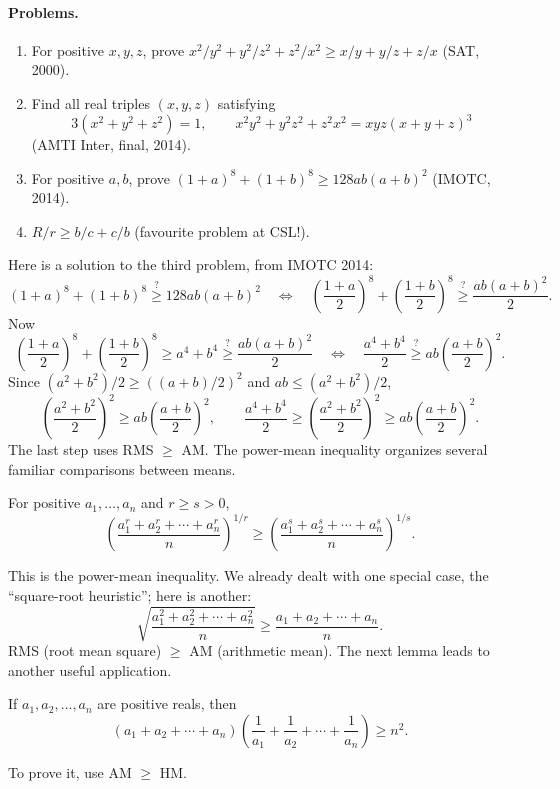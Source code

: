 \documentclass[11pt,a4paper]{article}
\begin{document}
\paragraph{Problems.}
\begin{enumerate}
\setcounter{enumi}{0}\item For positive $x,y,z$, prove $x^2/y^2+y^2/z^2+z^2/x^2\geq x/y+y/z+z/x$ (SAT, 2000).
\setcounter{enumi}{1}\item Find all real triples $(x,y,z)$ satisfying
\[3(x^2+y^2+z^2)=1,\qquad x^2y^2+y^2z^2+z^2x^2=xyz(x+y+z)^3\]
(AMTI Inter, final, 2014).
\setcounter{enumi}{2}\item For positive $a,b$, prove $(1+a)^8+(1+b)^8\geq128ab(a+b)^2$ (IMOTC, 2014).
\setcounter{enumi}{3}\item $R/r\geq b/c+c/b$ (favourite problem at CSL!).
\end{enumerate}
Here is a solution to the third problem, from IMOTC 2014:
\[
(1+a)^8+(1+b)^8\mathrel{\stackrel{?}{\geq}}128ab(a+b)^2
\quad\Longleftrightarrow\quad
\left(\frac{1+a}{2}\right)^8+\left(\frac{1+b}{2}\right)^8
\mathrel{\stackrel{?}{\geq}}\frac{ab(a+b)^2}{2}.
\]
Now
\[
\left(\frac{1+a}{2}\right)^8+\left(\frac{1+b}{2}\right)^8
\geq a^4+b^4\mathrel{\stackrel{?}{\geq}}\frac{ab(a+b)^2}{2}
\quad\Longleftrightarrow\quad
\frac{a^4+b^4}{2}\mathrel{\stackrel{?}{\geq}}ab\left(\frac{a+b}{2}\right)^2.
\]
Since $(a^2+b^2)/2\geq((a+b)/2)^2$ and $ab\leq(a^2+b^2)/2$,
\[
\left(\frac{a^2+b^2}{2}\right)^2\geq ab\left(\frac{a+b}{2}\right)^2,
\qquad
\frac{a^4+b^4}{2}\geq\left(\frac{a^2+b^2}{2}\right)^2
\geq ab\left(\frac{a+b}{2}\right)^2.
\]
The last step uses RMS $\geq$ AM.
The power-mean inequality organizes several familiar comparisons between means.
\setcounter{theorem}{73}\begin{lemma}\label{lemma:lb1-77}
For positive $a_1,\ldots,a_n$ and $r\geq s>0$,
\[\left(\frac{a_1^r+a_2^r+\cdots+a_n^r}{n}\right)^{1/r}
\geq\left(\frac{a_1^s+a_2^s+\cdots+a_n^s}{n}\right)^{1/s}.\]
\end{lemma}
This is the power-mean inequality. We already dealt with one special case, the ``square-root heuristic''; here is another:
\[\sqrt{\frac{a_1^2+a_2^2+\cdots+a_n^2}{n}}\geq\frac{a_1+a_2+\cdots+a_n}{n}.\]
RMS (root mean square) $\geq$ AM (arithmetic mean).
The next lemma leads to another useful application.
\setcounter{theorem}{74}\begin{lemma}\label{lemma:lb1-78}
If $a_1,a_2,\ldots,a_n$ are positive reals, then
\[(a_1+a_2+\cdots+a_n)\left(\frac1{a_1}+\frac1{a_2}+\cdots+\frac1{a_n}\right)\geq n^2.\]
\end{lemma}
To prove it, use AM $\geq$ HM.
\end{document}
